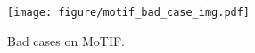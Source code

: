 \begin{figure}[h]
    \vspace{-12mm}
    \centering
    \texttt{[image: figure/motif\_bad\_case\_img.pdf]}
    \vspace{-2mm}
    \caption{Bad cases on MoTIF.}
    \vspace{-3mm}
    \label{fig: motif bad case}
\end{figure}
